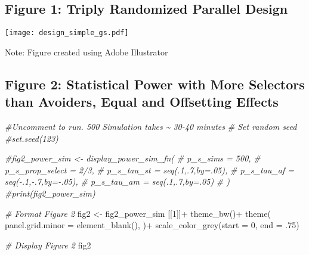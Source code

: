 \documentclass[
]{article}
\newenvironment{Shaded}{\begin{snugshade}}{\end{snugshade}}
\newcommand{\AttributeTok}[1]{\textcolor[rgb]{0.77,0.63,0.00}{#1}}
\newcommand{\CommentTok}[1]{\textcolor[rgb]{0.56,0.35,0.01}{\textit{#1}}}
\newcommand{\DecValTok}[1]{\textcolor[rgb]{0.00,0.00,0.81}{#1}}
\newcommand{\FunctionTok}[1]{\textcolor[rgb]{0.00,0.00,0.00}{#1}}
\newcommand{\NormalTok}[1]{#1}
\newcommand{\OtherTok}[1]{\textcolor[rgb]{0.56,0.35,0.01}{#1}}
\newcommand{\SpecialCharTok}[1]{\textcolor[rgb]{0.00,0.00,0.00}{#1}}
\begin{document}
\hypertarget{figure-1-triply-randomized-parallel-design}{%
\subsection{Figure 1: Triply Randomized Parallel
Design}\label{figure-1-triply-randomized-parallel-design}}

\texttt{[image: design\_simple\_gs.pdf]}

Note: Figure created using Adobe Illustrator

\setcounter{figure}{1}

\hypertarget{figure-2-statistical-power-with-more-selectors-than-avoiders-equal-and-offsetting-effects}{%
\subsection{Figure 2: Statistical Power with More Selectors than
Avoiders, Equal and Offsetting
Effects}\label{figure-2-statistical-power-with-more-selectors-than-avoiders-equal-and-offsetting-effects}}

\begin{Shaded}
\begin{Highlighting}[]
\CommentTok{\#Uncomment to run. 500 Simulation takes \textasciitilde{} 30{-}40 minutes}
\CommentTok{\# Set random seed}
\CommentTok{\#set.seed(123)}

\CommentTok{\#fig2\_power\_sim \textless{}{-} display\_power\_sim\_fn(}
\CommentTok{\#                       p\_s\_sims = 500,}
\CommentTok{\#                       p\_s\_prop\_select = 2/3,}
\CommentTok{\#                       p\_s\_tau\_st = seq(.1,.7,by=.05),}
\CommentTok{\#                       p\_s\_tau\_af = seq({-}.1,{-}.7,by={-}.05),}
\CommentTok{\#                       p\_s\_tau\_am = seq(.1,.7,by=.05)}
\CommentTok{\#                       )}
\CommentTok{\#print(fig2\_power\_sim)}

\CommentTok{\# Format Figure 2}
\NormalTok{fig2 }\OtherTok{\textless{}{-}}\NormalTok{ fig2\_power\_sim [[}\DecValTok{1}\NormalTok{]]}\SpecialCharTok{+}
  \FunctionTok{theme\_bw}\NormalTok{()}\SpecialCharTok{+}
  \FunctionTok{theme}\NormalTok{(}
    \AttributeTok{panel.grid.minor =} \FunctionTok{element\_blank}\NormalTok{(),}
\NormalTok{  )}\SpecialCharTok{+}
  \FunctionTok{scale\_color\_grey}\NormalTok{(}\AttributeTok{start =} \DecValTok{0}\NormalTok{, }\AttributeTok{end =}\NormalTok{ .}\DecValTok{75}\NormalTok{)}

\CommentTok{\# Display Figure 2}
\NormalTok{fig2}
\end{Highlighting}
\end{Shaded}
\end{document}
